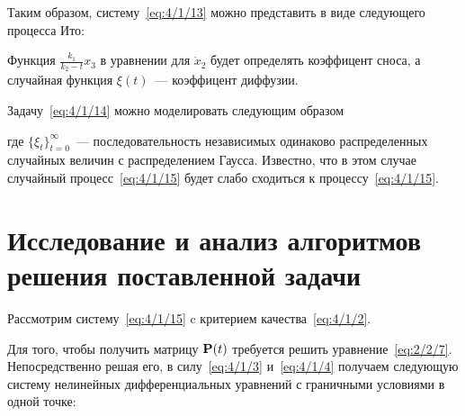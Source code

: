 Таким образом, систему~\ref{eq:4/1/13} можно представить в виде следующего процесса Ито:

\eeq

Функция $\frac{k_1}{k_2 - t} x_3$ в уравнении для $\dot{x}_2$ будет определять коэффицент сноса, а случайная функция $\xi(t)$~--- коэффицент диффузии.

Задачу~\ref{eq:4/1/14} можно моделировать следующим образом

\eeq

где $\{\xi_t\}_{t=0}^\infty$~--- последовательность независимых одинаково распределенных случайных величин с распределением Гаусса. Известно\cite{ARKHIPOV}, что в этом случае случайный процесс~\ref{eq:4/1/15} будет слабо сходиться к процессу~\ref{eq:4/1/15}.



\section{Исследование и анализ алгоритмов решения поставленной задачи}



Рассмотрим систему~\ref{eq:4/1/15} c критерием качества~\ref{eq:4/1/2}.

Для того, чтобы получить матрицу $\mathbf{P}(t)$ требуется решить уравнение~\vref{eq:2/2/7}. Непосредственно решая его, в силу~\ref{eq:4/1/3} и~\ref{eq:4/1/4} получаем следующую систему нелинейных дифференциальных уравнений с граничными условиями в одной точке:

